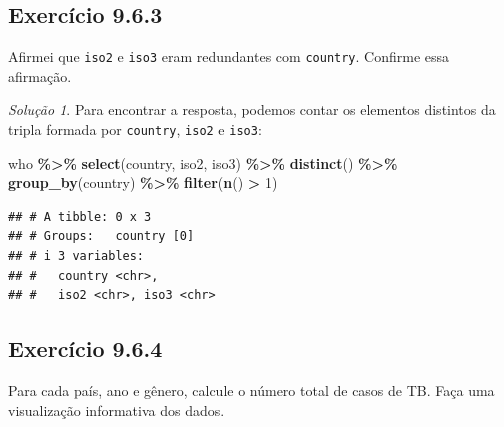 \documentclass[
]{latex/krantz}
\newenvironment{Shaded}{\begin{snugshade}}{\end{snugshade}}
\newcommand{\DecValTok}[1]{\textcolor[rgb]{0.00,0.00,0.81}{#1}}
\newcommand{\FunctionTok}[1]{\textcolor[rgb]{0.13,0.29,0.53}{\textbf{#1}}}
\newcommand{\NormalTok}[1]{#1}
\newcommand{\SpecialCharTok}[1]{\textcolor[rgb]{0.81,0.36,0.00}{\textbf{#1}}}
\theoremstyle{definition}
\theoremstyle{definition}
\theoremstyle{definition}
\theoremstyle{definition}
\theoremstyle{remark}
\newtheorem*{solution}{Solução}
\begin{document}
\hypertarget{exr9-6-3}{%
\subsection*{Exercício 9.6.3}\label{exr9-6-3}}

Afirmei que \texttt{iso2} e \texttt{iso3} eram redundantes com \texttt{country}. Confirme essa afirmação.

\begin{solution}

Para encontrar a resposta, podemos contar os elementos distintos da tripla formada por \texttt{country}, \texttt{iso2} e \texttt{iso3}:

\begin{Shaded}
\begin{Highlighting}[]
\NormalTok{who }\SpecialCharTok{\%\textgreater{}\%}
  \FunctionTok{select}\NormalTok{(country, iso2, iso3) }\SpecialCharTok{\%\textgreater{}\%}
  \FunctionTok{distinct}\NormalTok{() }\SpecialCharTok{\%\textgreater{}\%}
  \FunctionTok{group\_by}\NormalTok{(country) }\SpecialCharTok{\%\textgreater{}\%}
  \FunctionTok{filter}\NormalTok{(}\FunctionTok{n}\NormalTok{() }\SpecialCharTok{\textgreater{}} \DecValTok{1}\NormalTok{)}
\end{Highlighting}
\end{Shaded}

\begin{verbatim}
## # A tibble: 0 x 3
## # Groups:   country [0]
## # i 3 variables:
## #   country <chr>,
## #   iso2 <chr>, iso3 <chr>
\end{verbatim}

\end{solution}

\hypertarget{exr9-6-4}{%
\subsection*{Exercício 9.6.4}\label{exr9-6-4}}

Para cada país, ano e gênero, calcule o número total de casos de TB. Faça uma visualização informativa dos dados.
\end{document}
